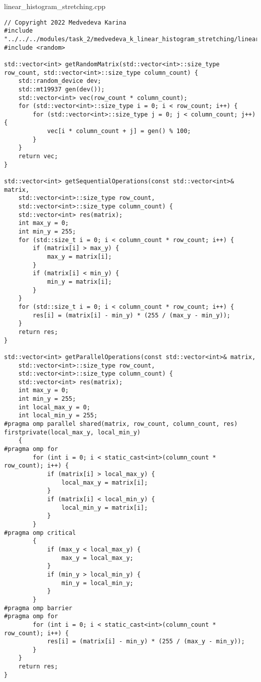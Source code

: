 \documentclass{report}
\begin{document}
\par linear\_histogram\_stretching.cpp
\begin{lstlisting}
// Copyright 2022 Medvedeva Karina
#include "../../../modules/task_2/medvedeva_k_linear_histogram_stretching/linear_histogram_stretching.h"
#include <random>

std::vector<int> getRandomMatrix(std::vector<int>::size_type row_count, std::vector<int>::size_type column_count) {
    std::random_device dev;
    std::mt19937 gen(dev());
    std::vector<int> vec(row_count * column_count);
    for (std::vector<int>::size_type i = 0; i < row_count; i++) {
        for (std::vector<int>::size_type j = 0; j < column_count; j++) {
            vec[i * column_count + j] = gen() % 100;
        }
    }
    return vec;
}

std::vector<int> getSequentialOperations(const std::vector<int>& matrix,
    std::vector<int>::size_type row_count,
    std::vector<int>::size_type column_count) {
    std::vector<int> res(matrix);
    int max_y = 0;
    int min_y = 255;
    for (std::size_t i = 0; i < column_count * row_count; i++) {
        if (matrix[i] > max_y) {
            max_y = matrix[i];
        }
        if (matrix[i] < min_y) {
            min_y = matrix[i];
        }
    }
    for (std::size_t i = 0; i < column_count * row_count; i++) {
        res[i] = (matrix[i] - min_y) * (255 / (max_y - min_y));
    }
    return res;
}

std::vector<int> getParallelOperations(const std::vector<int>& matrix,
    std::vector<int>::size_type row_count,
    std::vector<int>::size_type column_count) {
    std::vector<int> res(matrix);
    int max_y = 0;
    int min_y = 255;
    int local_max_y = 0;
    int local_min_y = 255;
#pragma omp parallel shared(matrix, row_count, column_count, res) firstprivate(local_max_y, local_min_y)
    {
#pragma omp for
        for (int i = 0; i < static_cast<int>(column_count * row_count); i++) {
            if (matrix[i] > local_max_y) {
                local_max_y = matrix[i];
            }
            if (matrix[i] < local_min_y) {
                local_min_y = matrix[i];
            }
        }
#pragma omp critical
        {
            if (max_y < local_max_y) {
                max_y = local_max_y;
            }
            if (min_y > local_min_y) {
                min_y = local_min_y;
            }
        }
#pragma omp barrier
#pragma omp for
        for (int i = 0; i < static_cast<int>(column_count * row_count); i++) {
            res[i] = (matrix[i] - min_y) * (255 / (max_y - min_y));
        }
    }
    return res;
}
\end{lstlisting}
\end{document}
